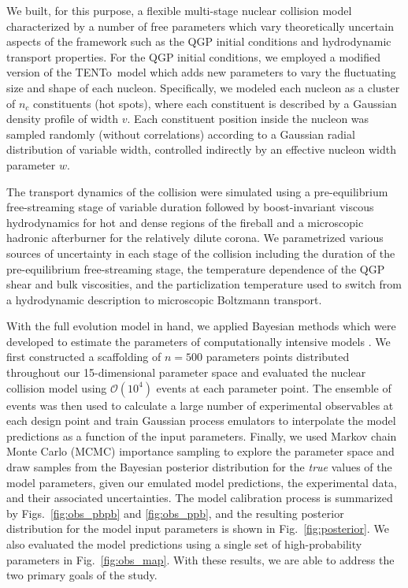 \documentclass[aps,prc,reprint,amsmath,nofootinbib]{revtex4-1}
\newcommand{\trento}{T\raisebox{-0.5ex}{R}ENTo}
\newcommand{\order}[1]{$\mathcal O(10^{#1})$}
\begin{document}
We built, for this purpose, a flexible multi-stage nuclear collision model characterized by a number of free parameters which vary theoretically uncertain aspects of the framework such as the QGP initial conditions and hydrodynamic transport properties.
For the QGP initial conditions, we employed a modified version of the \trento\ model \cite{Moreland:2014oya} which adds new parameters to vary the fluctuating size and shape of each nucleon.
Specifically, we modeled each nucleon as a cluster of $n_c$ constituents (hot spots), where each constituent is described by a Gaussian density profile of width $v$.
Each constituent position inside the nucleon was sampled randomly (without correlations) according to a Gaussian radial distribution of variable width, controlled indirectly by an effective nucleon width parameter $w$.

The transport dynamics of the collision were simulated using a pre-equilibrium free-streaming stage of variable duration followed by boost-invariant viscous hydrodynamics for hot and dense regions of the fireball and a microscopic hadronic afterburner for the relatively dilute corona.
We parametrized various sources of uncertainty in each stage of the collision including the duration of the pre-equilibrium free-streaming stage, the temperature dependence of the QGP shear and bulk viscosities, and the particlization temperature used to switch from a hydrodynamic description to microscopic Boltzmann transport.

With the full evolution model in hand, we applied Bayesian methods which were developed to estimate the parameters of computationally intensive models \cite{OHagan:2006ba, Higdon:2008cmc, Higdon:2014tva}.
We first constructed a scaffolding of $n=500$ parameters points distributed throughout our 15-dimensional parameter space and evaluated the nuclear collision model using \order{4} events at each parameter point.
The ensemble of events was then used to calculate a large number of experimental observables at each design point and train Gaussian process emulators to interpolate the model predictions as a function of the input parameters.
Finally, we used Markov chain Monte Carlo (MCMC) importance sampling to explore the parameter space and draw samples from the Bayesian posterior distribution for the \emph{true} values of the model parameters, given our emulated model predictions, the experimental data, and their associated uncertainties.
The model calibration process is summarized by Figs.~\ref{fig:obs_pbpb} and \ref{fig:obs_ppb}, and the resulting posterior distribution for the model input parameters is shown in Fig.~\ref{fig:posterior}.
We also evaluated the model predictions using a single set of high-probability parameters in Fig.~\ref{fig:obs_map}.
With these results, we are able to address the two primary goals of the study.
\end{document}
